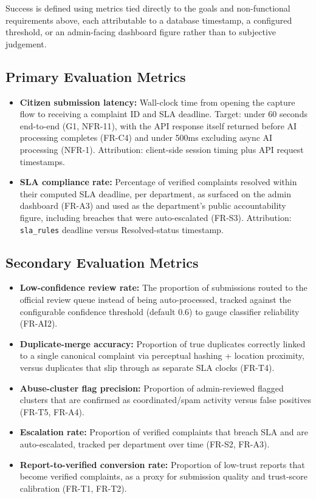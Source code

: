 \documentclass[12pt,a4paper]{article}
\begin{document}
Success is defined using metrics tied directly to the goals and non-functional requirements above, each attributable to a database timestamp, a configured threshold, or an admin-facing dashboard figure rather than to subjective judgement.

\subsection{Primary Evaluation Metrics}

\begin{itemize}
    \item \textbf{Citizen submission latency:} Wall-clock time from opening the capture flow to receiving a complaint ID and SLA deadline. Target: under 60 seconds end-to-end (G1, NFR-11), with the API response itself returned before AI processing completes (FR-C4) and under 500ms excluding async AI processing (NFR-1). Attribution: client-side session timing plus API request timestamps.

    \item \textbf{SLA compliance rate:} Percentage of verified complaints resolved within their computed SLA deadline, per department, as surfaced on the admin dashboard (FR-A3) and used as the department's public accountability figure, including breaches that were auto-escalated (FR-S3). Attribution: \texttt{sla\_rules} deadline versus Resolved-status timestamp.
\end{itemize}

\subsection{Secondary Evaluation Metrics}

\begin{itemize}
    \item \textbf{Low-confidence review rate:} The proportion of submissions routed to the official review queue instead of being auto-processed, tracked against the configurable confidence threshold (default 0.6) to gauge classifier reliability (FR-AI2).

    \item \textbf{Duplicate-merge accuracy:} Proportion of true duplicates correctly linked to a single canonical complaint via perceptual hashing + location proximity, versus duplicates that slip through as separate SLA clocks (FR-T4).

    \item \textbf{Abuse-cluster flag precision:} Proportion of admin-reviewed flagged clusters that are confirmed as coordinated/spam activity versus false positives (FR-T5, FR-A4).

    \item \textbf{Escalation rate:} Proportion of verified complaints that breach SLA and are auto-escalated, tracked per department over time (FR-S2, FR-A3).

    \item \textbf{Report-to-verified conversion rate:} Proportion of low-trust reports that become verified complaints, as a proxy for submission quality and trust-score calibration (FR-T1, FR-T2).
\end{itemize}
\end{document}
